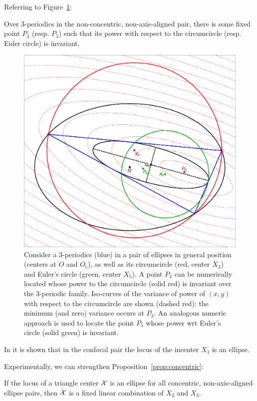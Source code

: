 Referring to Figure~\ref{fig:p3p5-non-concentric}:

\begin{conjecture}
Over 3-periodics in the non-concentric, non-axis-aligned pair, there is some fixed point $P_3$ (resp. $P_5$) such that its power with respect to the circumcircle (resp. Euler circle) is invariant. 
\end{conjecture}

\begin{figure}
    \centering
    \includegraphics[width=.6\textwidth]{pics/0140_nonconc_tilted_p3p5.eps}
    \caption{Consider a 3-periodics (blue) in a pair of ellipses in general position (centers at $O$ and $O_c$), as well as its circumcircle (red, center $X_3$) and Euler's circle (green, center $X_5$). A point $P_3$ can be numerically located whose power to the circumcircle (solid red) is invariant over the 3-periodic family. Iso-curves of the variance of power of $(x,y)$ with respect to the circumcircle are shown (dashed red): the minimum (and zero) variance occurs at $P_3$. An analogous numeric approach is used to locate the point $P_5$ whose power wrt Euler's circle (solid green) is invariant.}
    \label{fig:p3p5-non-concentric}
\end{figure}

In \cite{olga14,garcia2019-incenter} it is shown that in the confocal pair the locus of the incenter $X_1$ is an ellipse.

Experimentally, we can strengthen Proposition~\ref{prop:concentric}: 

\begin{conjecture}
If the locus of a triangle center $\mathcal{X}$ is an ellipse for all concentric, non-axis-aligned ellipse pairs, then $\mathcal{X}$ is a fixed linear combination of $X_2$ and $X_3$. 
\label{conj:concentric}
\end{conjecture} 

